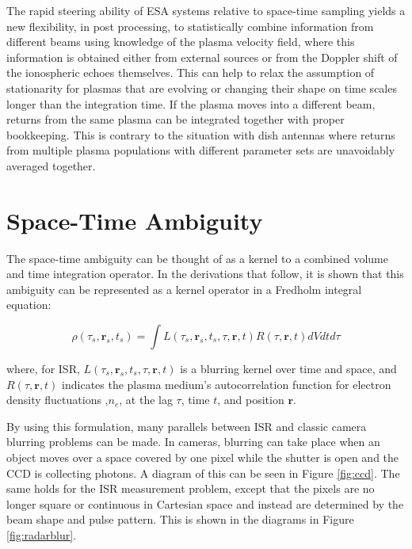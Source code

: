 The rapid steering ability of ESA systems relative to space-time sampling yields a new flexibility, in post processing, to statistically combine information from different beams using knowledge of the plasma velocity field, where this information is obtained either from external sources or from the Doppler shift of the ionospheric echoes themselves. This can help to relax the assumption of stationarity for plasmas that are evolving or changing their shape on time scales longer than the integration time. If the plasma moves into a different beam, returns from the same plasma can be integrated together with proper bookkeeping. This is contrary to the situation with dish antennas where returns from multiple plasma populations with different parameter sets are unavoidably averaged together.


\section{Space-Time Ambiguity}
\label{sec:sptimeamb}

The space-time ambiguity can be thought of as a kernel to a combined volume and time integration operator. In the derivations that follow, it is shown that this ambiguity can be represented as a kernel operator in a Fredholm integral equation:

\begin{equation}
\label{eqn:friedholm}
\rho(\tau_s ,\mathbf{r}_{s},t_s) = \int L(\tau_s, \mathbf{r}_{s},t_s,\tau,\mathbf{r},t) R(\tau,\mathbf{r},t) dVd t d\tau
\end{equation}

\noindent where, for ISR, $L(\tau_s, \mathbf{r}_{s},t_s,\tau,\mathbf{r},t) $ is a blurring kernel over time and space, and $R(\tau,\mathbf{r},t) $ indicates the plasma medium's autocorrelation function  for electron density fluctuations ,$n_e$, at the lag $\tau$, time $t$, and position $\mathbf{r}$.

By using this formulation, many parallels between ISR and classic camera blurring problems can be made. In cameras, blurring can take place when an object moves over a space covered by one pixel while the shutter is open and the CCD is collecting photons. A diagram of this can be seen in Figure \ref{fig:ccd}. The same holds for the ISR measurement problem, except that the pixels are no longer square or continuous in Cartesian space and instead are determined by the beam shape and pulse pattern. This is shown in the diagrams in Figure \ref{fig:radarblur}.


